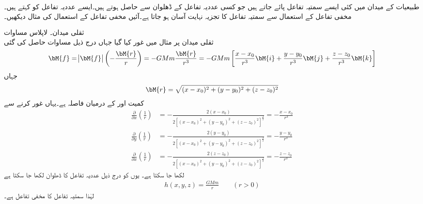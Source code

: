 طبیعیات کے میدان میں کئی ایسے سمتیہ  تفاعل پائے جاتے ہیں جو کسی عددیہ تفاعل کے   ڈھلوان سے حاصل ہوتے ہیں۔ایسے عددیہ تفاعل کو  کہتے ہیں۔ مخفی تفاعل کے استعمال سے سمتیہ  تفاعل کا تجزیہ نہایت آسان ہو جاتا ہے۔آئیں مخفی تفاعل کے استعمال کی مثال دیکھیں۔

\quad ثقلی میدان۔ لاپلاس مساوات\\
ثقلی میدان پر مثال  میں غور کیا گیا جہاں درج ذیل مساوات حاصل کی گئی
\begin{align}
\bM{f}=\abs{\bM{f}}\left(-\frac{\bM{r}}{r}\right)=-GMm\frac{\bM{r}}{r^3}=-GMm\left[\frac{x-x_0}{r^3}\bM{i}+\frac{y-y_0}{r^3}\bM{j}+\frac{z-z_0}{r^3}\bM{k}\right]
\end{align}
جہاں
\begin{align*}
\bM{r}=\sqrt{(x-x_0)^2+(y-y_0)^2+(z-z_0)^2}
\end{align*}
کمیت  اور  کے درمیان فاصلہ ہے۔یہاں غور کرنے سے 
\begin{align}
\frac{\partial }{\partial x}\left(\frac{1}{r}\right)&=-\frac{2(x-x_0)}{2[(x-x_0)^2+(y-y_0)^2+(z-z_0)^2]^{\frac{3}{2}}}=-\frac{x-x_0}{r^3}\\
\frac{\partial }{\partial y}\left(\frac{1}{r}\right)&=-\frac{2(y-y_0)}{2[(x-x_0)^2+(y-y_0)^2+(z-z_0)^2]^{\frac{3}{2}}}=-\frac{y-y_0}{r^3}\\
\frac{\partial }{\partial x}\left(\frac{1}{r}\right)&=-\frac{2(z-z_0)}{2[(x-x_0)^2+(y-y_0)^2+(z-z_0)^2]^{\frac{3}{2}}}=-\frac{z-z_0}{r^3}
\end{align}
لکھا جا سکتا ہے۔ یوں  کو درج ذیل عددیہ تفاعل کا ڈھلوان لکھا جا سکتا ہے
\begin{align}
h(x,y,z)=\frac{GMm}{r}\quad \quad (r>0)
\end{align}
لہٰذا سمتیہ  تفاعل  کا مخفی تفاعل  ہے۔

